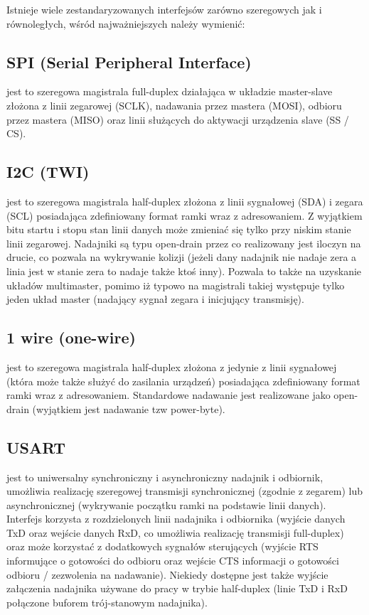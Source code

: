 \documentclass{pdfBooklets}
\begin{document}
Istnieje wiele zestandaryzowanych interfejsów zarówno szeregowych jak i równoległych, wśród najważniejszych należy wymienić:

\subsection{SPI (Serial Peripheral Interface)}
    jest to szeregowa magistrala full-duplex działająca w układzie master-slave złożona z linii zegarowej (SCLK), nadawania przez mastera (MOSI), odbioru przez mastera (MISO) oraz linii służących do aktywacji urządzenia slave (SS / CS). 
\subsection{I2C (TWI)}
    jest to szeregowa magistrala half-duplex złożona z linii sygnałowej (SDA) i zegara (SCL) posiadająca zdefiniowany format ramki wraz z adresowaniem. Z wyjątkiem bitu startu i stopu stan linii danych może zmieniać się tylko przy niskim stanie linii zegarowej.
    Nadajniki są typu open-drain przez co realizowany jest iloczyn na drucie, co pozwala na wykrywanie kolizji (jeżeli dany nadajnik nie nadaje zera a linia jest w stanie zera to nadaje także ktoś inny). Pozwala to także na uzyskanie układów multimaster, pomimo iż typowo na magistrali takiej występuje tylko jeden układ master (nadający sygnał zegara i inicjujący transmisję). 
\subsection{1 wire (one-wire)}
    jest to szeregowa magistrala half-duplex złożona z jedynie z linii sygnałowej (która może także służyć do zasilania urządzeń) posiadająca zdefiniowany format ramki wraz z adresowaniem. Standardowe nadawanie jest realizowane jako open-drain (wyjątkiem jest nadawanie tzw power-byte). 
\subsection{USART}
    jest to uniwersalny synchroniczny i asynchroniczny nadajnik i odbiornik, umożliwia realizację szeregowej transmisji synchronicznej (zgodnie z zegarem) lub asynchronicznej (wykrywanie początku ramki na podstawie linii danych). Interfejs korzysta z rozdzielonych linii nadajnika i odbiornika (wyjście danych TxD oraz wejście danych RxD, co umożliwia realizację transmisji full-duplex) oraz może korzystać z dodatkowych sygnałów sterujących (wyjście RTS informujące o gotowości do odbioru oraz wejście CTS informacji o gotowości odbioru / zezwolenia na nadawanie). Niekiedy dostępne jest także wyjście załączenia nadajnika używane do pracy w trybie half-duplex (linie TxD i RxD połączone buforem trój-stanowym nadajnika).
\end{document}
